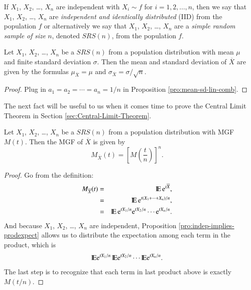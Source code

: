 \documentclass[captions=tableheading]{scrbook}
\begin{document}
\label{sub:simple-random-samples}

\begin{defn}
If \(X_{1}\), \(X_{2}\), \ldots{}, \(X_{n}\) are independent with \(X_{i}\sim f\) for \(i=1,2,\ldots,n\), then we say that \(X_{1}\), \(X_{2}\), \ldots{}, \(X_{n}\) are \emph{independent and identically distributed} (IID) from the population \(f\) or alternatively we say that \(X_{1}\), \(X_{2}\), \ldots{}, \(X_{n}\) are a \emph{simple random sample of size} \(n\), denoted \(SRS(n)\), from the population \(f\). 
\end{defn}

\begin{prop}
\label{pro:mean-sd-xbar}
Let \(X_{1}\), \(X_{2}\), \ldots{}, \(X_{n}\) be a \(SRS(n)\) from a population distribution with mean \(\mu\) and finite standard deviation \(\sigma\). Then the mean and standard deviation of \(\overline{X}\) are given by the formulas \(\mu_{\overline{X}}=\mu\) and \(\sigma_{\overline{X}}=\sigma/\sqrt{n}\).
\end{prop}

\begin{proof}
Plug in \(a_{1}=a_{2}=\cdots=a_{n}=1/n\) in Proposition \ref{pro:mean-sd-lin-comb}.
\end{proof}

The next fact will be useful to us when it comes time to prove the Central Limit Theorem in Section \ref{sec:Central-Limit-Theorem}.

\begin{prop}
\label{pro:mgf-xbar}
Let \(X_{1}\), \(X_{2}\), \ldots{}, \(X_{n}\) be a \(SRS(n)\) from a population distribution with MGF \(M(t)\). Then the MGF of \(\overline{X}\) is given by
\begin{equation}
M_{\overline{X}}(t)=\left[M\left(\frac{t}{n}\right)\right]^{n}.
\end{equation}
\end{prop}

\begin{proof}
Go from the definition:
\begin{eqnarray*}
M_{\overline{X}}(t) & = & \mathrm{I\hspace{-1.5pt}E}\,\mathrm{e}^{t\overline{X}},\\
 & = & \mathrm{I\hspace{-1.5pt}E}\,\mathrm{e}^{t(X_{1}+\cdots+X_{n})/n},\\
 & = & \mathrm{I\hspace{-1.5pt}E}\,\mathrm{e}^{tX_{1}/n}\mathrm{e}^{tX_{2}/n}\cdots\mathrm{e}^{tX_{n}/n}.
\end{eqnarray*}
And because \(X_{1}\), \(X_{2}\), \ldots{}, \(X_{n}\) are independent, Proposition \ref{pro:indep-implies-prodexpect} allows us to distribute the expectation among each term in the product, which is
\[
\mathrm{I\hspace{-1.5pt}E}\mathrm{e}^{tX_{1}/n}\,\mathrm{I\hspace{-1.5pt}E}\mathrm{e}^{tX_{2}/n}\cdots\mathrm{I\hspace{-1.5pt}E}\mathrm{e}^{tX_{n}/n}.
\]
The last step is to recognize that each term in last product above is exactly \(M(t/n)\).
\end{proof}
\end{document}
